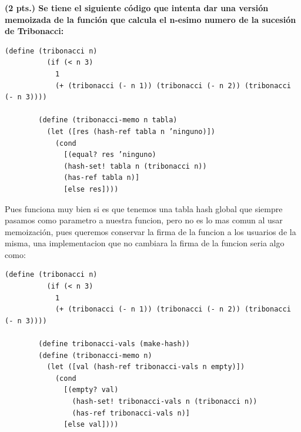 \documentclass[journal,12pt,onecolumn]{IEEEtran}                %
\theoremstyle{break}                                            %
\begin{document}
\begin{itemize}
           \textbf{(2 pts.) Se tiene el siguiente código que intenta dar una versión 
      memoizada de la función que calcula el n-esimo
      numero de la sucesión de Tribonacci:}

      \begin{lstlisting}[gobble=8]
        (define (tribonacci n)
          (if (< n 3)
            1
            (+ (tribonacci (- n 1)) (tribonacci (- n 2)) (tribonacci (- n 3))))

        (define (tribonacci-memo n tabla)
          (let ([res (hash-ref tabla n ’ninguno)])
            (cond
              [(equal? res ’ninguno)
              (hash-set! tabla n (tribonacci n))
              (has-ref tabla n)]
              [else res])))
      \end{lstlisting}

      Pues funciona muy bien si es que tenemos una tabla hash global que siempre pasamos
      como parametro a nuestra funcion, pero no es lo mas comun al usar memoización, pues
      queremos conservar la firma de la funcion a los usuarios de la misma, una implementacion que 
      no cambiara la firma de la funcion seria algo como:
      
      \begin{lstlisting}[gobble=8]
        (define (tribonacci n)
          (if (< n 3)
            1
            (+ (tribonacci (- n 1)) (tribonacci (- n 2)) (tribonacci (- n 3))))

        (define tribonacci-vals (make-hash))
        (define (tribonacci-memo n)
          (let ([val (hash-ref tribonacci-vals n empty)])
            (cond
              [(empty? val)
                (hash-set! tribonacci-vals n (tribonacci n))
                (has-ref tribonacci-vals n)]
              [else val])))
      \end{lstlisting}


\end{itemize}
\end{document}

